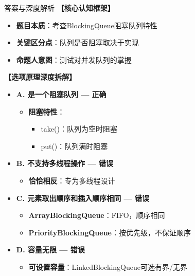 \documentclass[12pt, a4paper]{ctexart}
\begin{document}
\begin{enumerate}[label=\textbf{\arabic*.}]
\begin{bluebox}{答案与深度解析}
		      \textbf{【核心认知框架】}
		      \begin{itemize}[label={}, leftmargin=*, nosep]
			      \item \textbf{题目本质}：考查BlockingQueue阻塞队列特性
			      \item \textbf{关键区分点}：队列是否阻塞取决于实现
			      \item \textbf{命题人意图}：测试对并发队列的掌握
		      \end{itemize}

		      \textbf{【选项原理深度拆解】}
					  \begin{itemize}[label={}, leftmargin=*, nosep]

		      \item \textbf{A. 是一个阻塞队列 — 正确}
		      \begin{itemize}[label={}, leftmargin=*, nosep]
			      \item \textbf{阻塞特性}：
			            \begin{itemize}[label={}, nosep]
				            \item take()：队列为空时阻塞
				            \item put()：队列满时阻塞
			            \end{itemize}
		      \end{itemize}

		      \item \textbf{B. 不支持多线程操作 — 错误}
		      \begin{itemize}[label={}, leftmargin=*, nosep]
			      \item \textbf{恰恰相反}：专为多线程设计
		      \end{itemize}

		      \item \textbf{C. 元素取出顺序和插入顺序相同 — 错误}
		      \begin{itemize}[label={}, leftmargin=*, nosep]
			      \item \textbf{ArrayBlockingQueue}：FIFO，顺序相同
			      \item \textbf{PriorityBlockingQueue}：按优先级，不保证顺序
		      \end{itemize}

		      \item \textbf{D. 容量无限 — 错误}
		      \begin{itemize}[label={}, leftmargin=*, nosep]
			      \item \textbf{可设置容量}：LinkedBlockingQueue可选有界/无界
		      \end{itemize}


\end{itemize}
\end{bluebox}
\end{enumerate}
\end{document}
